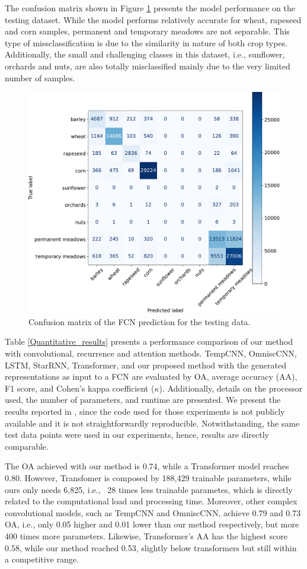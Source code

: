 \documentclass[journal,article,submit,pdftex,moreauthors]{Definitions/mdpi}
\begin{document}
The confusion matrix shown in Figure \ref{confusion_matrix} presents the model performance on the testing dataset.
While the model performs relatively accurate for wheat, rapeseed and corn samples, permanent and temporary meadows are not separable. This type of missclassification is due to the similarity in nature of both crop types.
Additionally, the small and challenging classes in this dataset, i.e., sunflower, orchards and nuts, are also totally misclassified mainly due to the very limited number of samples.
\begin{figure}[H]
	\centering
	\includegraphics[width=.57\textwidth]{figures/confusion_matrix_fcn_run_9.pdf}
	\caption{Confusion matrix of the FCN prediction for the testing data.}
	\label{confusion_matrix}
\end{figure}
Table \ref{Quantitative_results} presents a performance comparison of our method with convolutional, recurrence and attention methods. 
TempCNN, OmniscCNN, LSTM, StarRNN, Transformer, and our proposed method with the generated representations as input to a FCN are evaluated by OA, average accuracy (AA), F1 score, and Cohen's kappa coefficient ($\kappa$). 
Additionally, details on the processor used, the number of parameters, and runtime are presented. 
We present the results reported in \cite{Russwurm2020}, since the code used for those experiments is not publicly available and it is not straightforwardly reproducible. 
Notwithstanding, the same test data points were used in our experiments, hence, results are directly comparable.

The OA achieved with our method is 0.74, while a Transformer model reaches 0.80. However, Transfomer is composed by 188,429 trainable parameters, while ours only needs 6,825, i.e., ~28 times less trainable parametes, which is directly related to the computational load and processing time. 
Moreover, other complex convolutional models, such as TempCNN and OmniscCNN, achieve 0.79 and 0.73 OA, i.e., only 0.05 higher and 0.01 lower than our method respectively, but more 400 times more parameters.
Likewise, Transformer's AA has the highest score 0.58, while our method reached 0.53, slightly below transformers but still within a competitive range.
\end{document}
